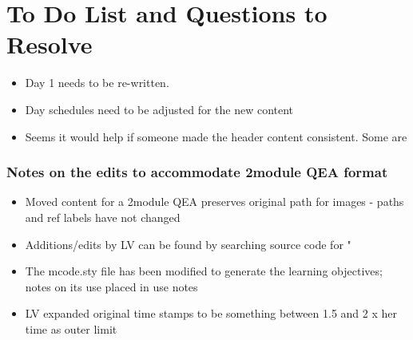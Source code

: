 \chapter*{To Do List and Questions to Resolve}

\listoftodos

\begin{itemize}
\item Day 1 needs to be re-written.
\item Day schedules need to be adjusted for the new content
\item Seems it would help if someone made the header content consistent. Some are %
\end{itemize}

\subsection{Notes on the edits to accommodate 2module QEA format}
\begin{itemize}
\item Moved content for a 2module QEA preserves original path for images - paths and ref labels have not changed
\item Additions/edits by LV can be found by searching source code for "%
\item The mcode.sty file has been modified to generate the learning objectives; notes on its use placed in use notes
\item LV expanded original time stamps to be something between 1.5 and 2 x her time as outer limit
\end{itemize}
